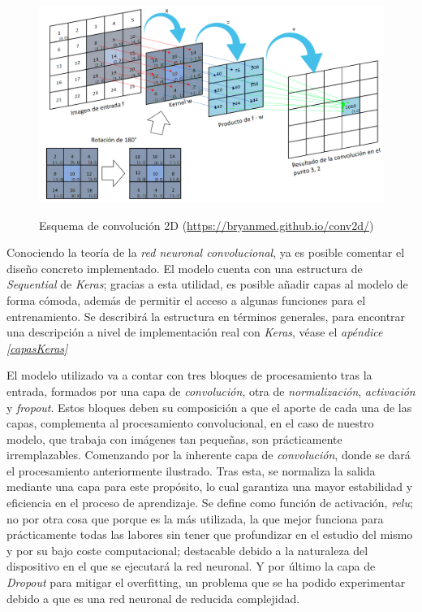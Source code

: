 \begin{figure}[h]
    \centering
    \includegraphics[width=1\textwidth]{capturas/conv2D.png}\\[-0,40cm]
    \caption{Esquema de convolución 2D\label{conv2d}
    {\scriptsize (\url{https://bryanmed.github.io/conv2d/})}}
\end{figure}

Conociendo la teoría de la \textit{red neuronal convolucional}, 
ya es posible comentar el diseño concreto implementado.
El modelo cuenta con una estructura de
\textit{Sequential} de \textit{Keras};
gracias a esta utilidad, es posible añadir capas al modelo de forma cómoda, además
de permitir el acceso a algunas funciones para el entrenamiento.
Se describirá la estructura en términos generales, para encontrar una descripción
a nivel de implementación real con \textit{Keras}, véase el \textit{apéndice
\ref{capasKeras}}

El modelo utilizado va a contar con tres bloques de procesamiento tras la entrada,
formados por una capa de \textit{convolución}, otra de \textit{normalización}, \textit{activación} y \textit{fropout}.
Estos bloques deben su composición a que el aporte de cada una de las capas,
complementa al procesamiento convolucional, en el caso de nuestro modelo, que
trabaja con imágenes tan pequeñas, son prácticamente irremplazables.
Comenzando por la inherente capa de \textit{convolución}, donde se dará el
procesamiento anteriormente ilustrado. Tras esta, se normaliza la salida mediante una capa
para este propósito, lo cual garantiza una mayor estabilidad y eficiencia
en el proceso de aprendizaje. Se define como función de activación, \textit{relu}; no
por otra cosa que porque es la más utilizada, la que mejor funciona para prácticamente
todas las labores sin tener que profundizar en el estudio del mismo y por su bajo
coste computacional; destacable debido a la naturaleza del dispositivo en el que
se ejecutará la red neuronal. Y por último la capa de \textit{Dropout} para mitigar
el overfitting, un problema que se ha podido experimentar debido a que es una red
neuronal de reducida complejidad.

